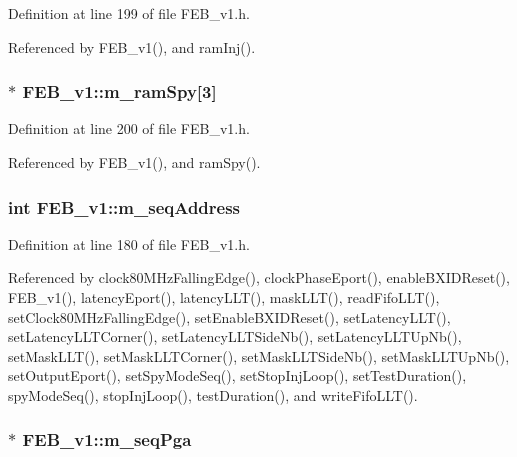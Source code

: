 Definition at line 199 of file FEB\_\-v1.h.

Referenced by FEB\_\-v1(), and ramInj().\hypertarget{classFEB__v1_ae6d8176c12bd60ad25ed81d535eb8c82}{
\subsubsection[{m\_\-ramSpy}]{$\ast$ {\bf FEB\_\-v1::m\_\-ramSpy}\mbox{[}3\mbox{]}}}
\label{classFEB__v1_ae6d8176c12bd60ad25ed81d535eb8c82}


Definition at line 200 of file FEB\_\-v1.h.

Referenced by FEB\_\-v1(), and ramSpy().\hypertarget{classFEB__v1_a1c1eb093fd1733b9510fcf8bc5c7ad08}{
\subsubsection[{m\_\-seqAddress}]{\setlength{\rightskip}{0pt plus 5cm}int {\bf FEB\_\-v1::m\_\-seqAddress}}}
\label{classFEB__v1_a1c1eb093fd1733b9510fcf8bc5c7ad08}


Definition at line 180 of file FEB\_\-v1.h.

Referenced by clock80MHzFallingEdge(), clockPhaseEport(), enableBXIDReset(), FEB\_\-v1(), latencyEport(), latencyLLT(), maskLLT(), readFifoLLT(), setClock80MHzFallingEdge(), setEnableBXIDReset(), setLatencyLLT(), setLatencyLLTCorner(), setLatencyLLTSideNb(), setLatencyLLTUpNb(), setMaskLLT(), setMaskLLTCorner(), setMaskLLTSideNb(), setMaskLLTUpNb(), setOutputEport(), setSpyModeSeq(), setStopInjLoop(), setTestDuration(), spyModeSeq(), stopInjLoop(), testDuration(), and writeFifoLLT().\hypertarget{classFEB__v1_a6c7804ac86796f233a8393043adf2e77}{
\subsubsection[{m\_\-seqPga}]{$\ast$ {\bf FEB\_\-v1::m\_\-seqPga}}}
\label{classFEB__v1_a6c7804ac86796f233a8393043adf2e77}


